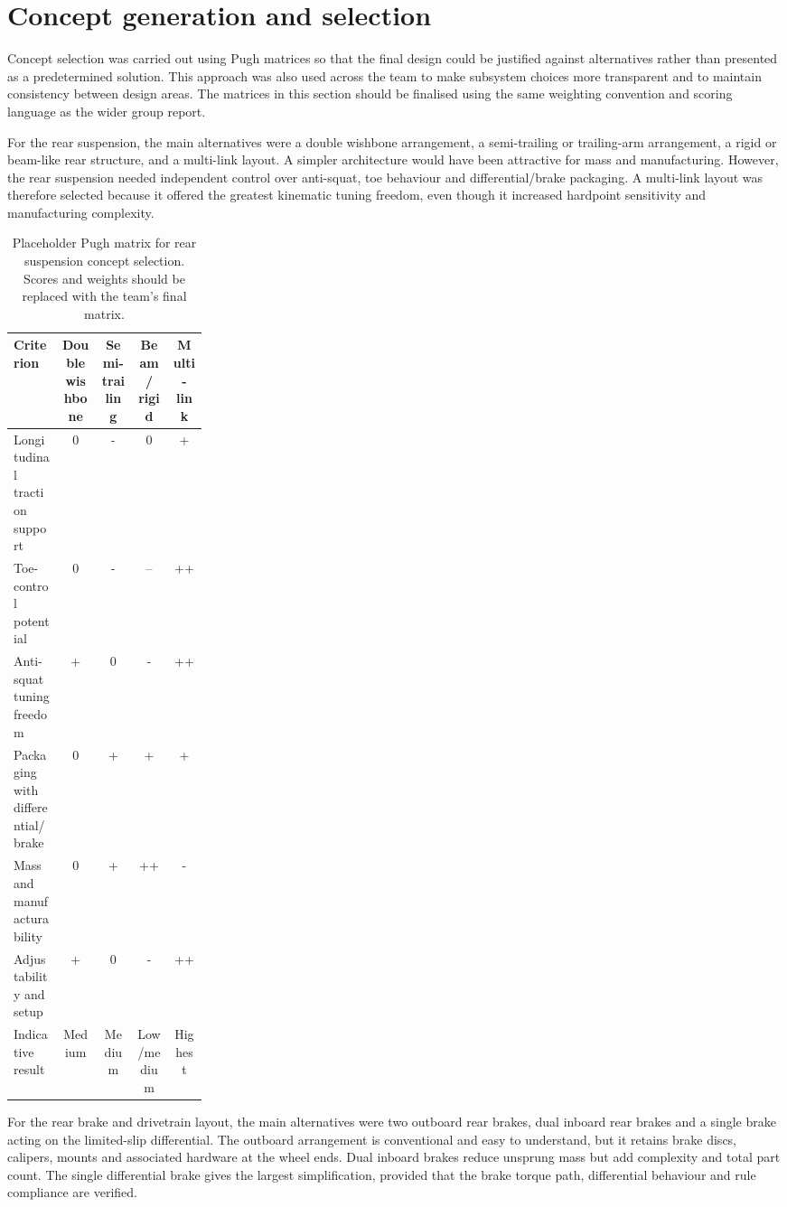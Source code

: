 \section{Concept generation and selection}

Concept selection was carried out using Pugh matrices so that the final design could be justified against alternatives rather than presented as a predetermined solution. This approach was also used across the team to make subsystem choices more transparent and to maintain consistency between design areas. The matrices in this section should be finalised using the same weighting convention and scoring language as the wider group report.

For the rear suspension, the main alternatives were a double wishbone arrangement, a semi-trailing or trailing-arm arrangement, a rigid or beam-like rear structure, and a multi-link layout. A simpler architecture would have been attractive for mass and manufacturing. However, the rear suspension needed independent control over anti-squat, toe behaviour and differential/brake packaging. A multi-link layout was therefore selected because it offered the greatest kinematic tuning freedom, even though it increased hardpoint sensitivity and manufacturing complexity.

\begin{table}[H]
\caption{Placeholder Pugh matrix for rear suspension concept selection. Scores and weights should be replaced with the team's final matrix.}
\label{tab:pugh_susp}
\centering
\begin{tabular}{p{0.25\linewidth}c c c c}
\toprule
Criterion & Double wishbone & Semi-trailing & Beam / rigid & Multi-link \\
\midrule
Longitudinal traction support & 0 & - & 0 & + \\
Toe-control potential & 0 & - & -- & ++ \\
Anti-squat tuning freedom & + & 0 & - & ++ \\
Packaging with differential/brake & 0 & + & + & + \\
Mass and manufacturability & 0 & + & ++ & - \\
Adjustability and setup & + & 0 & - & ++ \\
\midrule
Indicative result & Medium & Medium & Low/medium & Highest \\
\bottomrule
\end{tabular}
\end{table}

For the rear brake and drivetrain layout, the main alternatives were two outboard rear brakes, dual inboard rear brakes and a single brake acting on the limited-slip differential. The outboard arrangement is conventional and easy to understand, but it retains brake discs, calipers, mounts and associated hardware at the wheel ends. Dual inboard brakes reduce unsprung mass but add complexity and total part count. The single differential brake gives the largest simplification, provided that the brake torque path, differential behaviour and rule compliance are verified.


